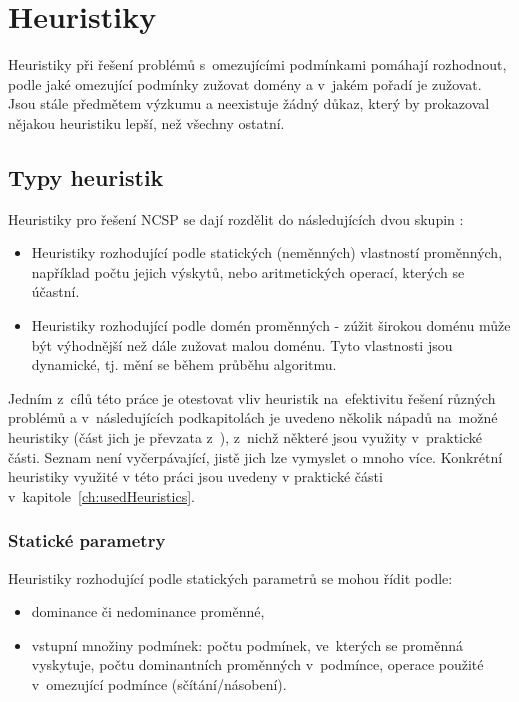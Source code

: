\section{Heuristiky}
Heuristiky při řešení problémů s~omezujícími podmínkami pomáhají rozhodnout, podle jaké omezující podmínky zužovat domény a v~jakém pořadí je zužovat. Jsou stále předmětem výzkumu a neexistuje žádný důkaz, který by prokazoval nějakou heuristiku lepší, než všechny ostatní. 

\subsection{Typy heuristik}
Heuristiky pro řešení NCSP se dají rozdělit do následujících dvou skupin \cite{feiten10}:

\begin{itemize}
  \item Heuristiky rozhodující podle statických (neměnných) vlastností proměnných, například počtu jejich výskytů, nebo aritmetických operací, kterých se účastní.
  \item Heuristiky rozhodující podle domén proměnných - zúžit širokou doménu může být výhodnější než dále zužovat malou doménu. Tyto vlastnosti jsou dynamické, tj. mění se během průběhu algoritmu.
\end{itemize}


Jedním z~cílů této práce je otestovat vliv heuristik na~efektivitu řešení různých problémů a v~následujících podkapitolách je uvedeno několik nápadů na~možné heuristiky (část jich je převzata z~\cite{feiten10}), z~nichž některé jsou využity v~praktické části. Seznam není vyčerpávající, jistě jich lze vymyslet o mnoho více. Konkrétní heuristiky využité v této práci jsou uvedeny v praktické části v~kapitole~\ref{ch:usedHeuristics}.

\subsubsection{Statické parametry}

Heuristiky rozhodující podle statických parametrů se mohou řídit podle:

\begin{itemize}
  \item dominance či nedominance proměnné,
  \item vstupní množiny podmínek:
        \subitem počtu podmínek, ve~kterých se proměnná vyskytuje,
        \subitem počtu dominantních proměnných v~podmínce,
        \subitem operace použité v~omezující podmínce (sčítání/násobení).
\end{itemize}

